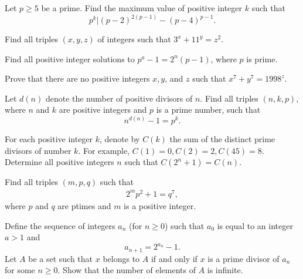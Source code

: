 \documentclass{subfile}
\begin{document}
	\begin{problem}
		Let $p \geq 5$ be a prime. Find the maximum value of positive integer $k$ such that
		\[p^{k}|(p-2)^{2(p-1)}-(p-4)^{p-1}.\]
	\end{problem} 
	

	
	\begin{problem} %
		Find all triples $(x,y,z)$ of integers such that $3^x+11^y=z^2$.
	\end{problem}

	\begin{problem} %
		Find all positive integer solutions to $p^a-1=2^n(p-1)$, where $p$ is prime.
	\end{problem}

	\begin{problem} %
		Prove that there are no positive integers $x,y$, and $z$ such that $x^7+y^7=1998^z$.
	\end{problem}

	\begin{problem} %
		Let $d(n)$ denote the number of positive divisors of $n$. Find all triples $(n,k,p)$, where $n$ and $k$ are positive integers and $p$ is a prime number, such that
		\[n^{d(n)} - 1 = p^k.\]
	\end{problem}

	\begin{problem}[IZHO 2017] %
		For each positive integer $k$, denote by $C(k)$ the sum of the distinct prime divisors of number $k$. For example, $C(1)=0,C(2)=2,C(45)=8$. Determine all positive integers $n$ such that $C(2^n+1)=C(n)$.
	\end{problem}

	\begin{problem} %
		Find all triples $(m,p,q)$ such that
		\begin{align*} 2^mp^2 +1=q^7, \end{align*}where $p$ and $q$ are ptimes and $m$ is a positive integer.
	\end{problem}

	\begin{problem}[Brazil 2016] %
		Define the sequence of integers $a_n$ (for $n \geq 0$) such that $a_0$ is equal to an integer $a>1$ and $$a_{n+1}=2^{a_n}-1.$$
		Let $A$ be a set such that $x$ belongs to $A$ if and only if $x$ is a prime divisor of $a_n$ for some $n \geq 0$. Show that the number of elements of $A$ is infinite.
	\end{problem}
\end{document}
